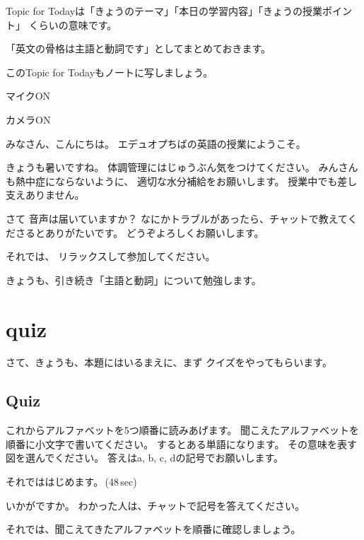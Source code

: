 \documentclass[book,jafontscale=0.9247]{jlreq}
\newenvironment{my_check}
  {\begin{itemize}
    \renewcommand\labelitemi{$\square\hspace{0.5em}$}} %
  {\end{itemize}}
\begin{document}
Topic for Todayは「きょうのテーマ」「本日の学習内容」「きょうの授業ポイント」
くらいの意味です。

「英文の骨格は主語と動詞です」としてまとめておきます。

このTopic for Todayもノートに写しましょう。

\newpage
\begin{my_check}
\item マイクON
\item カメラON
\end{my_check}

{\LARGE \ComputerMouse}

みなさん、こんにちは。
エデュオプちばの英語の授業にようこそ。

きょうも暑いですね。
体調管理にはじゅうぶん気をつけてください。
みんさんも熱中症にならないように、
適切な水分補給をお願いします。
授業中でも差し支えありません。

さて
音声は届いていますか？
なにかトラブルがあったら、チャットで教えてくださるとありがたいです。
どうぞよろしくお願いします。

それでは、
リラックスして参加してください。

きょうも、引き続き「主語と動詞」について勉強します。

{\large \ComputerMouse}



\section{quiz}
さて、きょうも、本題にはいるまえに、まず
クイズをやってもらいます。

{\large \ComputerMouse}

\subsection{Quiz}

これからアルファベットを5つ順番に読みあげます。
聞こえたアルファベットを順番に小文字で書いてください。
するとある単語になります。
その意味を表す図を選んでください。
答えはa, b, c, dの記号でお願いします。


それでははじめます。\faVolumeUp\,(48\,sec)

いかがですか。
わかった人は、チャットで記号を答えてください。

それでは、聞こえてきたアルファベットを順番に確認しましょう。{\large \ComputerMouse}
\end{document}
